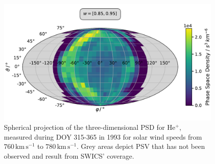 \begin{figure}[h]
	\includegraphics[width=1\textwidth]{Figures/sky_ps.pdf}
	\centering
	\caption{Spherical projection of the three-dimensional PSD for $\mathrm{He^{+}}$, measured during DOY 315-365 in 1993 for solar wind speeds from $760 \, \mathrm{km\,s^{-1}}$ to $780 \, \mathrm{km\,s^{-1}}$. Grey areas depict PSV that has not been observed and result from SWICS' coverage.}
	\label{fig:sky_psd}
\end{figure}
%
%
%
\clearpage
